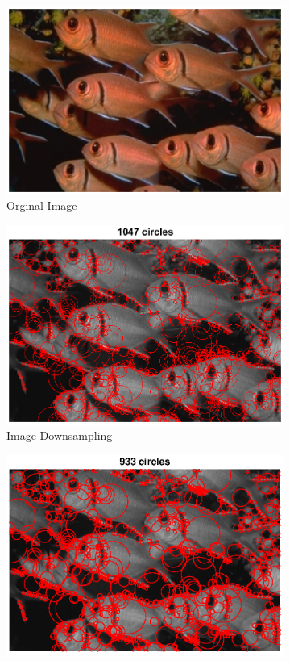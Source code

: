 \documentclass{article}
\newcommand{\tl}[1]{\textlatin{#1}}
\begin{document}
	\begin{figure}[H]
		\begin{subfigure}[b]{0.37\textwidth}
			\includegraphics[width=\textwidth]{res/fishes.eps}
			\caption{\tl{Orginal Image}}
		\end{subfigure}%
		\begin{subfigure}[b]{0.37\textwidth}
			\includegraphics[width=\textwidth]{res/fishes_blob_method2.eps}	
			\caption{\tl{Image Downsampling}}	
		\end{subfigure}%
		\begin{subfigure}[b]{0.37\textwidth}
			\includegraphics[width=\textwidth]{res/fishes_blob.eps}	

\end{subfigure}
\end{figure}
\end{document}
